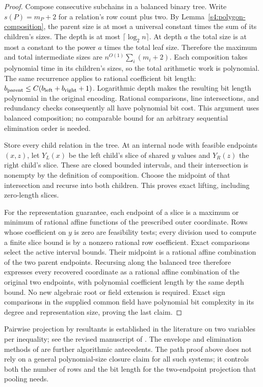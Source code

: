 \begin{proof}
Compose consecutive subchains in a balanced binary tree. Write
$s(P)=m_P+2$ for a relation's row count plus two. By
Lemma~\ref{s4:polygon-composition}, the parent size is at most a
universal constant times the sum of its children's sizes. The depth
is at most $\lceil\log_2 n\rceil$. At depth $a$ the total size is
at most a constant to the power $a$ times the total leaf size.
Therefore the maximum and total intermediate sizes are
$n^{O(1)}\sum_i(m_i+2)$. Each composition takes polynomial time in
its children's sizes, so the total arithmetic work is polynomial.
The same recurrence applies to rational coefficient bit length:
$b_{\rm parent}\le C(b_{\rm left}+b_{\rm right}+1)$. Logarithmic
depth makes the resulting bit length polynomial in the original
encoding. Rational comparisons, line intersections, and redundancy
checks consequently all have polynomial bit cost. This argument
uses balanced composition; no comparable bound for an arbitrary
sequential elimination order is needed.

Store every child relation in the tree. At an internal node with
feasible endpoints $(x,z)$, let $Y_L(x)$ be the left child's slice
of shared $y$ values and $Y_R(z)$ the right child's slice. These
are closed bounded intervals, and their intersection is nonempty
by the definition of composition. Choose the midpoint of that
intersection and recurse into both children. This proves exact
lifting, including zero-length slices.

For the representation guarantee, each endpoint of a slice is a
maximum or minimum of rational affine functions of the prescribed
outer coordinate. Rows whose coefficient on $y$ is zero are
feasibility tests; every division used to compute a finite slice
bound is by a nonzero rational row coefficient. Exact comparisons
select the active interval bounds. Their midpoint is a rational
affine combination of the two parent endpoints. Recursing along
the balanced tree therefore expresses every recovered coordinate
as a rational affine combination of the original two endpoints,
with polynomial coefficient length by the same depth bound. No
new algebraic root or field extension is required. Exact sign
comparisons in the supplied common field have polynomial bit
complexity in its degree and representation size, proving the last
claim.
\end{proof}

Pairwise projection by resultants is established in the literature on
two variables per inequality; see the revised manuscript of
\citet[Section~3]{s4:simon2010}. The envelope and elimination methods
of \citet[Section~2]{s4:hochbaum1994} are further algorithmic
antecedents. The path proof above does not rely on a general
polynomial-size closure claim for all such systems; it controls both
the number of rows and the bit length for the two-endpoint projection
that pooling needs.

